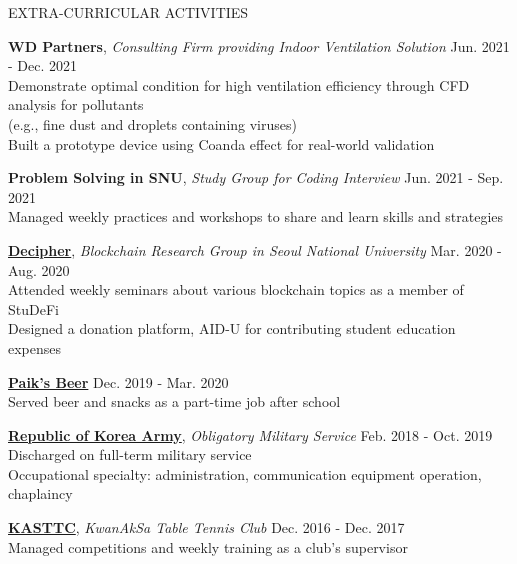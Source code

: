 \documentclass[12pt]{resume} %
\begin{document}
\begin{rSection}{EXTRA-CURRICULAR ACTIVITIES}
%

{\bf WD Partners}, \textit{Consulting Firm providing Indoor Ventilation Solution} \hfill Jun. 2021 - Dec. 2021\\
Demonstrate optimal condition for high ventilation efficiency through CFD analysis for pollutants \\
(e.g., fine dust and droplets containing viruses) \\
Built a prototype device using Coanda effect for real-world validation 

{\bf Problem Solving in SNU}, \textit{Study Group for Coding Interview} \hfill Jun. 2021 - Sep. 2021 \\
Managed weekly practices and workshops to share and learn skills and strategies

{\bf \href{https://decipher.ac/}{Decipher}}, \textit{Blockchain Research Group in Seoul National University} \hfill Mar. 2020 - Aug. 2020\\
Attended weekly seminars about various blockchain topics as a member of StuDeFi \\
Designed a donation platform, AID-U for contributing student education expenses 

{\bf \href{http://paiksbeer.com/}{Paik’s Beer}} \hfill Dec. 2019 - Mar. 2020\\
Served beer and snacks as a part-time job after school \

{\bf \href{https://www.army.mil.kr/}{Republic of Korea Army}}, \textit{Obligatory Military Service} \hfill Feb. 2018 - Oct. 2019 \\
Discharged on full-term military service \\
Occupational specialty: administration, communication equipment operation, chaplaincy 

{\bf \href{http://kasttc.kr/}{KASTTC}}, \textit{KwanAkSa Table Tennis Club} \hfill Dec. 2016 - Dec. 2017\\
Managed competitions and weekly training as a club's supervisor

\end{rSection}
\end{document}
